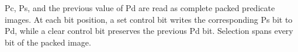 Pc, Ps, and the previous value of Pd are read as complete packed predicate
images.  At each bit position, a set control bit writes the corresponding Ps
bit to Pd, while a clear control bit preserves the previous Pd bit.  Selection
spans every bit of the packed image.
